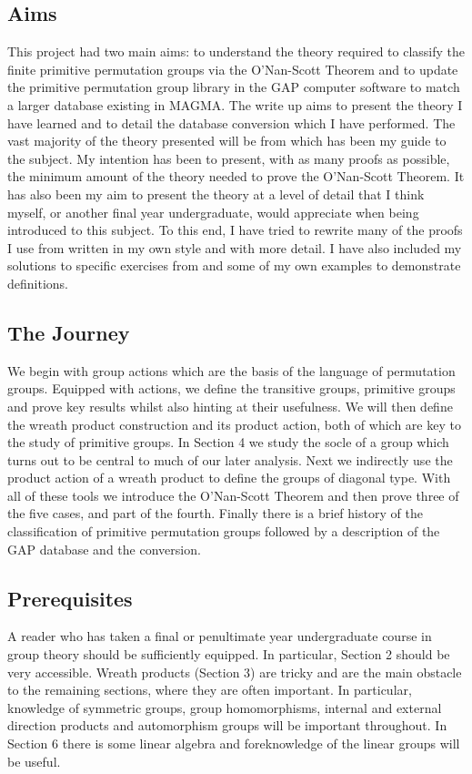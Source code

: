 \documentclass[]{article}
\theoremstyle{definition}
\begin{document}
\subsection{Aims}
This project had two main aims: to understand the theory required to classify the finite primitive permutation groups via the O'Nan-Scott Theorem and to update the primitive permutation group library in the GAP computer software to match a larger database existing in MAGMA. The write up aims to present the theory I have learned and to detail the database conversion which I have performed. The vast majority of the theory presented will be from \cite{dm} which has been my guide to the subject. My intention has been to present, with as many proofs as possible, the minimum amount of the theory needed to prove the O'Nan-Scott Theorem. It has also been my aim to present the theory at a level of detail that I think myself, or another final year undergraduate, would appreciate when being introduced to this subject. To this end, I have tried to rewrite many of the proofs I use from \cite{dm} written in my own style and with more detail. I have also included my solutions to specific exercises from \cite{dm} and some of my own examples to demonstrate definitions. 

\subsection{The Journey}
We begin with group actions which are the basis of the language of permutation groups. Equipped with actions, we define the transitive groups, primitive groups and prove key results whilst also hinting at their usefulness. We will then define the wreath product construction and its product action, both of which are key to the study of primitive groups. In Section 4 we study the socle of a group which turns out to be central to much of our later analysis. Next we indirectly use the product action of a wreath product to define the groups of diagonal type. With all of these tools we introduce the O'Nan-Scott Theorem and then prove three of the five cases, and part of the fourth. Finally there is a brief history of the classification of primitive permutation groups followed by a description of the GAP database and the conversion.

\subsection{Prerequisites}
A reader who has taken a final or penultimate year undergraduate course in group theory should be sufficiently equipped. In particular, Section 2 should be very accessible. Wreath products (Section 3) are tricky and are the main obstacle to the remaining sections, where they are often important. In particular, knowledge of symmetric groups, group homomorphisms, internal and external direction products and automorphism groups will be important throughout. In Section 6 there is some linear algebra and foreknowledge of the linear groups will be useful. 
\end{document}
